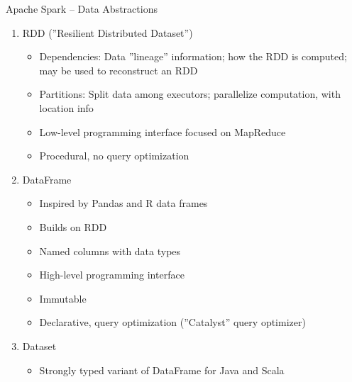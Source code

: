 \documentclass[ignorenonframetext,xcolor=x11names]{beamer}
\begin{document}
\begin{frame}{Apache Spark -- Data Abstractions}
\small
\begin{enumerate}
  \item RDD (''Resilient Distributed Dataset'')
  \begin{itemize}
    \item Dependencies: Data ''lineage'' information; how the RDD is computed; may be used to reconstruct an RDD
    \item Partitions: Split data among executors; parallelize computation, with location info
    \item Low-level programming interface focused on MapReduce
    \item Procedural, no query optimization
  \end{itemize}
  \item DataFrame
  \begin{itemize}
     \item Inspired by Pandas and R data frames
     \item Builds on RDD
     \item Named columns with data types
     \item High-level programming interface
     \item Immutable
     \item Declarative, query optimization (''Catalyst'' query optimizer)
  \end{itemize}
  \item Dataset
  \begin{itemize}
     \item Strongly typed variant of DataFrame for Java and Scala
  \end{itemize}
\end{enumerate}
\end{frame}
\end{document}
